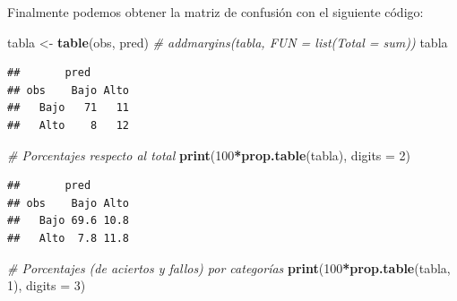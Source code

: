 \documentclass[
]{book}
\newenvironment{Shaded}{\begin{snugshade}}{\end{snugshade}}
\newcommand{\CommentTok}[1]{\textcolor[rgb]{0.56,0.35,0.01}{\textit{#1}}}
\newcommand{\DataTypeTok}[1]{\textcolor[rgb]{0.13,0.29,0.53}{#1}}
\newcommand{\DecValTok}[1]{\textcolor[rgb]{0.00,0.00,0.81}{#1}}
\newcommand{\FloatTok}[1]{\textcolor[rgb]{0.00,0.00,0.81}{#1}}
\newcommand{\KeywordTok}[1]{\textcolor[rgb]{0.13,0.29,0.53}{\textbf{#1}}}
\newcommand{\NormalTok}[1]{#1}
\newcommand{\OperatorTok}[1]{\textcolor[rgb]{0.81,0.36,0.00}{\textbf{#1}}}
\newcommand{\StringTok}[1]{\textcolor[rgb]{0.31,0.60,0.02}{#1}}
\theoremstyle{break}
\theoremstyle{definition}
\theoremstyle{definition}
\theoremstyle{definition}
\theoremstyle{remark}
\begin{document}
\begin{Shaded}
\end{Shaded}

Finalmente podemos obtener la matriz de confusión con el siguiente código:

\begin{Shaded}
\begin{Highlighting}[]
\NormalTok{tabla <-}\StringTok{ }\KeywordTok{table}\NormalTok{(obs, pred)}
\CommentTok{# addmargins(tabla, FUN = list(Total = sum))}
\NormalTok{tabla}
\end{Highlighting}
\end{Shaded}

\begin{verbatim}
##       pred
## obs    Bajo Alto
##   Bajo   71   11
##   Alto    8   12
\end{verbatim}

\begin{Shaded}
\begin{Highlighting}[]
\CommentTok{# Porcentajes respecto al total}
\KeywordTok{print}\NormalTok{(}\DecValTok{100}\OperatorTok{*}\KeywordTok{prop.table}\NormalTok{(tabla), }\DataTypeTok{digits =} \DecValTok{2}\NormalTok{) }
\end{Highlighting}
\end{Shaded}

\begin{verbatim}
##       pred
## obs    Bajo Alto
##   Bajo 69.6 10.8
##   Alto  7.8 11.8
\end{verbatim}

\begin{Shaded}
\begin{Highlighting}[]
\CommentTok{# Porcentajes (de aciertos y fallos) por categorías}
\KeywordTok{print}\NormalTok{(}\DecValTok{100}\OperatorTok{*}\KeywordTok{prop.table}\NormalTok{(tabla, }\DecValTok{1}\NormalTok{), }\DataTypeTok{digits =} \DecValTok{3}\NormalTok{) }
\end{Highlighting}
\end{Shaded}
\end{document}
